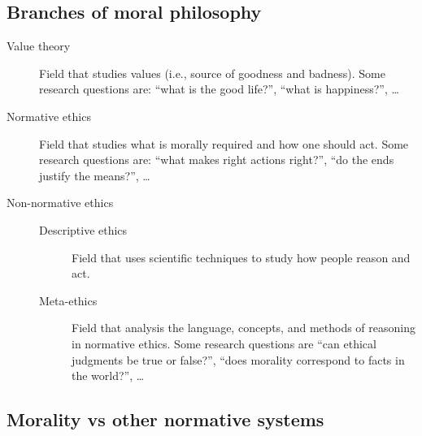 \subsection{Branches of moral philosophy}

\begin{description}
    \item[Value theory] 
        Field that studies values (i.e., source of goodness and badness). Some research questions are: ``what is the good life?'', ``what is happiness?'', \dots

    \item[Normative ethics] 
        Field that studies what is morally required and how one should act. Some research questions are: ``what makes right actions right?'', ``do the ends justify the means?'', \dots

    \item[Non-normative ethics] \phantom{}
        \begin{description}
            \item[Descriptive ethics] 
                Field that uses scientific techniques to study how people reason and act.

            \item[Meta-ethics] 
                Field that analysis the language, concepts, and methods of reasoning in normative ethics. Some research questions are ``can ethical judgments be true or false?'', ``does morality correspond to facts in the world?'', \dots
        \end{description}
\end{description}


\subsection{Morality vs other normative systems} \label{sec:morality_other_systems}

